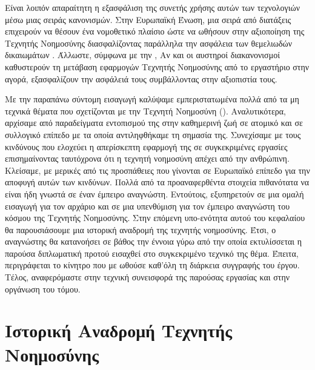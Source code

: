 Είναι λοιπόν απαραίτητη η εξασφάλιση της συνετής χρήσης αυτών των τεχνολογιών μέσω μιας σειράς κανονισμών. Στην Ευρωπαϊκή Ένωση, μια σειρά από διατάξεις επιχειρούν να θέσουν ένα νομοθετικό πλαίσιο ώστε να ωθήσουν στην αξιοποίηση της Τεχνητής Νοημοσύνης διασφαλίζοντας παράλληλα την ασφάλεια των θεμελιωδών δικαιωμάτων \cite{europeancomissionai2021}. Άλλωστε, σύμφωνα με την  \cite{VonderLeyen2019},  Αν και οι αυστηροί διακανονισμοί καθυστερούν τη μετάβαση εφαρμογών Τεχνητής Νοημοσύνης από το εργαστήριο στην αγορά, εξασφαλίζουν την ασφάλειά τους συμβάλλοντας στην αξιοπιστία τους.
\par

Με την παραπάνω σύντομη εισαγωγή καλύψαμε εμπεριστατωμένα πολλά από τα μη τεχνικά θέματα που σχετίζονται με την Τεχνητή Νοημοσύνη ().
Αναλυτικότερα, αρχίσαμε από παραδείγματα εντοπισμού της στην καθημερινή ζωή σε ατομικό και σε συλλογικό επίπεδο με τα οποία αντιληφθήκαμε τη σημασία της. Συνεχίσαμε με τους κινδύνους που ελοχεύει η απερίσκεπτη εφαρμογή της σε συγκεκριμένες εργασίες επισημαίνοντας ταυτόχρονα ότι η τεχνητή νοημοσύνη απέχει από την ανθρώπινη. Κλείσαμε, με μερικές από τις προσπάθειες που γίνονται σε Ευρωπαϊκό επίπεδο για την αποφυγή αυτών των κινδύνων.
Πολλά από τα προαναφερθέντα στοιχεία πιθανότατα να είναι ήδη γνωστά σε έναν έμπειρο αναγνώστη. Εντούτοις, εξυπηρετούν σε μια ομαλή εισαγωγή για τον αρχάριο και σε μια υπενθύμιση για τον έμπειρο αναγνώστη του κόσμου της Τεχνητής Νοημοσύνης.
Στην επόμενη υπο-ενότητα αυτού του κεφαλαίου θα παρουσιάσουμε μια ιστορική αναδρομή της τεχνητής νοημοσύνης. Έτσι, ο αναγνώστης θα κατανοήσει σε βάθος την έννοια γύρω από την οποία εκτυλίσσεται η παρούσα διπλωματική προτού εισαχθεί στο συγκεκριμένο τεχνικό της θέμα. Έπειτα, περιγράφεται το κίνητρο που με ωθούσε καθ'όλη τη διάρκεια συγγραφής του έργου. Τέλος, αναφερόμαστε στην τεχνική συνεισφορά της παρούσας εργασίας και στην οργάνωση του τόμου.



\section[Ιστορική Αναδρομή Τεχνιτής Νοημοσύνης]{Ιστορική Αναδρομή Τεχνητής Νοημοσύνης}
\label{sec:historic_note}

